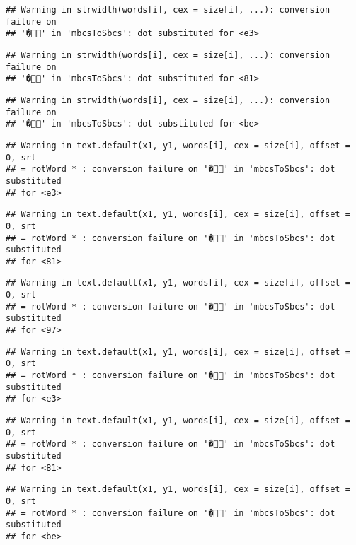 \documentclass[]{article}
\begin{document}
\begin{verbatim}
## Warning in strwidth(words[i], cex = size[i], ...): conversion failure on
## '�' in 'mbcsToSbcs': dot substituted for <e3>
\end{verbatim}

\begin{verbatim}
## Warning in strwidth(words[i], cex = size[i], ...): conversion failure on
## '�' in 'mbcsToSbcs': dot substituted for <81>
\end{verbatim}

\begin{verbatim}
## Warning in strwidth(words[i], cex = size[i], ...): conversion failure on
## '�' in 'mbcsToSbcs': dot substituted for <be>
\end{verbatim}

\begin{verbatim}
## Warning in text.default(x1, y1, words[i], cex = size[i], offset = 0, srt
## = rotWord * : conversion failure on '�' in 'mbcsToSbcs': dot substituted
## for <e3>
\end{verbatim}

\begin{verbatim}
## Warning in text.default(x1, y1, words[i], cex = size[i], offset = 0, srt
## = rotWord * : conversion failure on '�' in 'mbcsToSbcs': dot substituted
## for <81>
\end{verbatim}

\begin{verbatim}
## Warning in text.default(x1, y1, words[i], cex = size[i], offset = 0, srt
## = rotWord * : conversion failure on '�' in 'mbcsToSbcs': dot substituted
## for <97>
\end{verbatim}

\begin{verbatim}
## Warning in text.default(x1, y1, words[i], cex = size[i], offset = 0, srt
## = rotWord * : conversion failure on '�' in 'mbcsToSbcs': dot substituted
## for <e3>
\end{verbatim}

\begin{verbatim}
## Warning in text.default(x1, y1, words[i], cex = size[i], offset = 0, srt
## = rotWord * : conversion failure on '�' in 'mbcsToSbcs': dot substituted
## for <81>
\end{verbatim}

\begin{verbatim}
## Warning in text.default(x1, y1, words[i], cex = size[i], offset = 0, srt
## = rotWord * : conversion failure on '�' in 'mbcsToSbcs': dot substituted
## for <be>
\end{verbatim}
\end{document}
